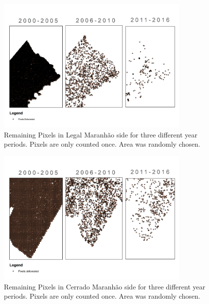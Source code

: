 
\chapter{}

\begin{table}
\begin{figure}[H]
  \centering
  \includegraphics[width=0.85\textwidth]{Chapter3/ML_pixels_death.png}
\caption[Remaining Pixels in Legal Maranhão side]{Remaining Pixels in Legal Maranhão side for three different year periods. Pixels are only counted once. Area was randomly chosen.}
\label{fig:remainingLM}
\end{figure}
\end{table}

\begin{table}
\begin{figure}[H]
  \centering
  \includegraphics[width=0.85\textwidth]{Chapter3/MA_pixels_death.png}
\caption[Remaining Pixels in Cerrado Maranhão side]{Remaining Pixels in Cerrado Maranhão side for three different year periods. Pixels are only counted once. Area was randomly chosen.}
\label{fig:remainingMA}
\end{figure}
\end{table}

